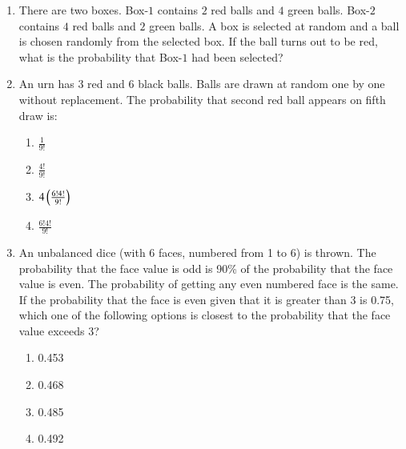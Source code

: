 \begin{enumerate}[label=\thesection.\arabic*.,ref=\thesection.\theenumi]
\begin{enumerate}
\end{enumerate}
%
\solution

%
%
\item There are two boxes. Box-$1$ contains $2$ red balls and $4$ green balls. Box-$2$ contains $4$ red balls and $2$ green balls. A box is selected at random and a ball is chosen randomly from the selected box. If the ball turns out to be red, what is the probability that Box-$1$ had been selected?
%
\solution

%
\item An urn has 3 red and 6 black balls. Balls are drawn at random one by one without replacement. The probability that second red ball appears on fifth draw is: \\
\begin{enumerate}
    \item $\frac{1}{9!}$
    \newline
    \item $\frac{4!}{9!}$
    \newline
    \item $4\left(\frac{6!4!}{9!}\right)$
    \newline
    \item $\frac{6!4!}{9!}$
\end{enumerate}
%
%
\solution

%
\item An unbalanced dice (with 6 faces, numbered from 1 to 6) is thrown. The probability that the face value is odd is 90\% of the probability that the face value is even. The probability of getting any even numbered face is the same. If the probability that the face is even given that it is greater than 3 is 0.75, which one of the following options is closest to the probability that the face value exceeds 3?\\[7pt]
\begin{enumerate}[label=(\Alph*)]
    \item  0.453
    \item  0.468
    \item  0.485
    \item  0.492
\end{enumerate}

\end{enumerate}
